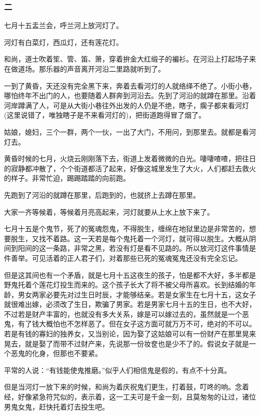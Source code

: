 \subsubsection*{二}
\par 七月十五盂兰会，呼兰河上放河灯了。
\par 河灯有白菜灯，西瓜灯，还有莲花灯。
\par 和尚，道士吹着笙、管、笛、箫，穿着拚金大红缎子的褊衫。在河沿上打起场子来在做道场。那乐器的声音离开河沿二里路就听到了。
\par 一到了黄昏，天还没有完全黑下来，奔着去看河灯的人就络绎不绝了。小街小巷，哪怕终年不出门的人，也要随着人群奔到河沿去。先到了河沿的就蹲在那里。沿着河岸蹲满了人，可是从大街小巷往外出发的人仍是不绝，瞎子，瘸子都来看河灯(这里说错了，唯独瞎子是不来看河灯的)，把街道跑得冒了烟了。
\par 姑娘，媳妇，三个一群，两个一伙，一出了大门，不用问，到那里去。就都是看河灯去。
\par 黄昏时候的七月，火烧云刚刚落下去，街道上发着微微的白光。啛啛喳喳，把往日的寂静都冲散了，个个街道都活了起来，好像这城里发生了大火，人们都赶去救火的样子。非常忙迫，踢踢踏踏的向前跑。
\par 先跑到了河沿的就蹲在那里，后跑到的，也就挤上去蹲在那里。
\par 大家一齐等候着，等候着月亮高起来，河灯就要从上水上放下来了。
\par 七月十五是个鬼节，死了的冤魂怨鬼，不得脱生，缠绵在地狱里边是非常苦的，想要脱生，又找不着路。这一天若是每个鬼托着一个河灯，就可得以脱生。大概从阴间到阳间的这一条路，非常之黑，若没有灯是看不见路的。所以放河灯这件事情是件善举。可见活着的正人君子们，对着那些已死的冤魂冤鬼还没有完全忘记。
\par 但是这其间也有一个矛盾，就是七月十五这夜生的孩子，怕是都不大好，多半都是野鬼托着个莲花灯投生而来的。这个孩子长大了将不被父母所喜欢。长到结婚的年龄，男女两家必要先对过生日时辰，才能够结亲。若是女家生在七月十五，这女子就很难出嫁，必须改了生日，欺骗了男家。若是男家七月十五的生日，也不大好，不过若是财产丰富的，也就没有多大关系，嫁是可以嫁过去的，虽然就是一个恶鬼，有了钱大概怕也不怎样恶了。但在女子这方面可就万万不可，绝对的不可以。若是有钱的寡妇的独养女，又当别论，因为娶了这姑娘可以有一份财产在那里晃来晃去，就是娶了而带不过财产来，先说那一份妆奁也是少不了的。假说女子就是一个恶鬼的化身，但那也不要紧。
\par 平常的人说：“有钱能使鬼推磨。”似乎人们相信鬼是假的，有点不十分真。
\par 但是当河灯一放下来的时候，和尚为着庆祝鬼们更生，打着鼓，叮咚的响。念着经，好像紧急符咒似的，表示着，这一工夫可是千金一刻，且莫匆匆的让过，诸位男鬼女鬼，赶快托着灯去投生吧。
